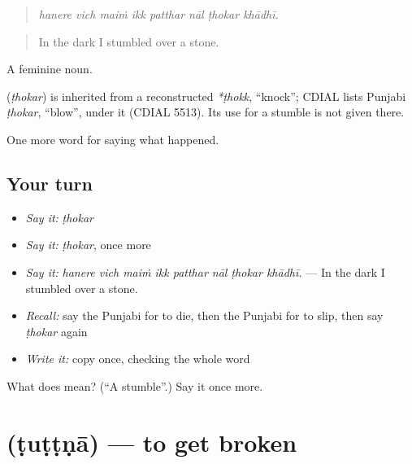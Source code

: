 \begin{quote}
       
\end{quote}

\begin{quote}
\emph{hanere vich maiṁ ikk patthar nāl ṭhokar khādhī.}
\end{quote}

\begin{quote}
In the dark I stumbled over a stone.
\end{quote}

A feminine noun.

\begin{cousinweb}
\textbf{} (\emph{ṭhokar}) is inherited from a reconstructed \emph{*ṭhokk}, \textquotedblleft{}knock\textquotedblright{}; CDIAL lists Punjabi \emph{ṭhokar}, \textquotedblleft{}blow\textquotedblright{}, under it (CDIAL 5513). Its use for a stumble is not given there.
\end{cousinweb}

\begin{grammarlens}[title={What you've built}]
One more word for saying what happened.
\end{grammarlens}

\subsection*{Your turn}
\begin{itemize}
\raggedright
  \item \emph{Say it:} \emph{ṭhokar}
  \item \emph{Say it:} \emph{ṭhokar}, once more
  \item \emph{Say it:} \emph{hanere vich maiṁ ikk patthar nāl ṭhokar khādhī.} — In the dark I stumbled over a stone.
  \item \emph{Recall:} say the Punjabi for to die, then the Punjabi for to slip, then say \emph{ṭhokar} again
  \item \emph{Write it:} copy \textbf{} once, checking the whole word
\end{itemize}

\begin{tcolorbox}[breakable,colback=teal!4,colframe=teal!35!black,title={Before you move on}]
What does  mean? (\textquotedblleft{}A stumble\textquotedblright{}.) Say it once more.
\end{tcolorbox}
\section[\texorpdfstring{\pa{ਟੁੱਟਣਾ} (ṭuṭṭṇā)}{ਟੁੱਟਣਾ (ṭuṭṭṇā)}]{ (ṭuṭṭṇā) — to get broken}

